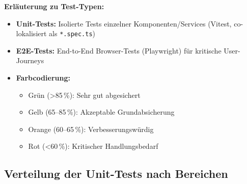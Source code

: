 \vspace{0.5cm}

\textbf{Erläuterung zu Test-Typen:}
\begin{itemize}[noitemsep]
	\item \textbf{Unit-Tests:} Isolierte Tests einzelner Komponenten/Services (Vitest, co-lokalisiert als \texttt{*.spec.ts})
	\item \textbf{E2E-Tests:} End-to-End Browser-Tests (Playwright) für kritische User-Journeys
	\item \textbf{Farbcodierung:}
	\begin{itemize}[noitemsep]
		\item \colorbox{green!20}{Grün} (>85\,\%): Sehr gut abgesichert
		\item \colorbox{yellow!20}{Gelb} (65--85\,\%): Akzeptable Grundabsicherung
		\item \colorbox{orange!20}{Orange} (60--65\,\%): Verbesserungswürdig
		\item \colorbox{red!20}{Rot} (<60\,\%): Kritischer Handlungsbedarf
	\end{itemize}
\end{itemize}

\vspace{0.5cm}

\subsection*{Verteilung der Unit-Tests nach Bereichen}

